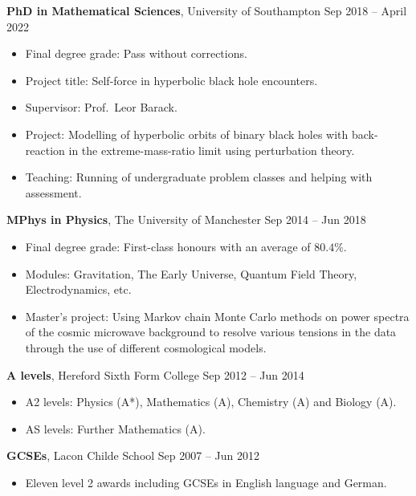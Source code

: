 \documentclass[10.5pt, oneside]{article}   	%
\begin{document}
\textbf{PhD in Mathematical Sciences}, University of Southampton \hfill Sep 2018 -- April 2022 \\
\vspace{-5mm}
\begin{itemize}
\item Final degree grade: Pass without corrections.
\item Project title: Self-force in hyperbolic black hole encounters.
\item Supervisor: Prof.\ Leor Barack.
\item Project: Modelling of hyperbolic orbits of binary black holes with back-reaction in the extreme-mass-ratio limit using perturbation theory. 
\item Teaching: Running of undergraduate problem classes and helping with assessment.
\end{itemize}

\textbf{MPhys in Physics}, The University of Manchester \hfill Sep 2014 -- Jun 2018 \\
\vspace{-5mm}
\begin{itemize}
\item Final degree grade: First-class honours with an average of $80.4\%$.
\item Modules: Gravitation, The Early Universe, Quantum Field Theory,  Electrodynamics, etc.
\item Master's project: Using Markov chain Monte Carlo methods on power spectra of the cosmic microwave background to resolve various tensions in the data through the use of different cosmological models.
\end{itemize} 

\textbf{A levels}, Hereford Sixth Form College \hfill Sep 2012 -- Jun 2014 \\
\vspace{-5mm}
\begin{itemize}
\item A2 levels: Physics (A*), Mathematics (A), Chemistry (A) and Biology (A).
\item AS levels: Further Mathematics (A).
\end{itemize} 

\textbf{GCSEs}, Lacon Childe School \hfill Sep 2007 -- Jun 2012\\
\vspace{-5mm}
\begin{itemize}
\item Eleven level 2 awards including GCSEs in English language and German.
\end{itemize} 
\end{document}
